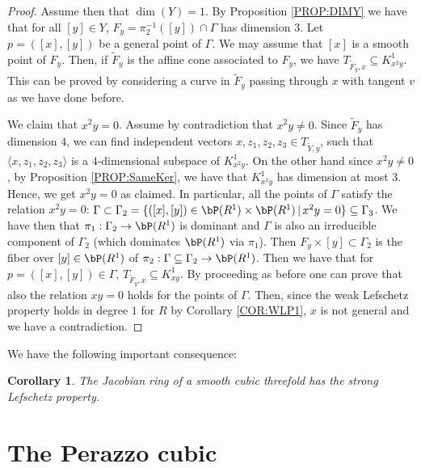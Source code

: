 \documentclass[a4paper,11pt]{amsart}
\newtheorem{corollary}[theorem]{Corollary}
\begin{document}
\begin{proof}
Assume then that $\dim(Y)=1$. By Proposition \ref{PROP:DIMY} we have that for all $[y]\in Y$, $F_y=\pi_2^{-1}([y])\cap \Gamma$ has dimension $3$. Let $p=([x],[y])$ be a general point of $\Gamma$. We may assume that $[x]$ is a smooth point of $F_y$. Then, if $\tilde{F}_y$ is the affine cone associated to $F_y$, we have $T_{\tilde{F}_y,x}\subseteq K^1_{x^2y}$. This can be proved by considering a curve in $\tilde{F}_y$ passing through $x$ with tangent $v$ as we have done before. 
\vspace{2mm}

We claim that $x^2y=0$. Assume by contradiction that $x^2y\neq 0$. Since $\tilde{F}_y$ has dimension $4$, we can find independent vectors $x,z_1,z_2,z_3 \in T_{\tilde{Y},y}$, such that $\langle x,z_1,z_2,z_3\rangle$ is a $4$-dimensional subspace of $K^1_{x^2y}$. On the other hand since $x^2y\neq 0$, by Proposition \ref{PROP:SameKer}, we have that $K^1_{x^2y}$ has dimension at most $3$. Hence, we get $x^2y=0$ as claimed. In particular, all the points of $\Gamma$ satisfy the relation $x^2y=0$: $\Gamma\subset \Gamma_2=\{([x],[y])\in \bP(R^1)\times \bP(R^1)\,|\, x^2y=0\}\subseteq \Gamma_3$. We have then that $\pi_1:\Gamma_2\to \bP(R^1)$ is dominant and $\Gamma$ is also an irreducible component of $\Gamma_2$ (which dominates $\bP(R^1)$ via $\pi_1$). Then $F_y\times [y]\subset \Gamma_2$ is the fiber over $[y]\in \bP(R^1)$ of $\pi_2:\Gamma\subseteq \Gamma_2\to \bP(R^1)$. Then we have that for $p=([x],[y])\in \Gamma$, $T_{\tilde{F}_y,x}\subseteq K^1_{xy}$. By proceeding as before one can prove that also the relation $xy=0$ holds for the points of $\Gamma$. Then, since the weak Lefschetz property holds in degree $1$ for $R$ by Corollary \ref{COR:WLP1}, $x$ is not general and we have a contradiction.
\end{proof}

We have the following important consequence:
\begin{corollary}
The Jacobian ring of a smooth cubic threefold has the strong Lefschetz property.
\end{corollary}




\section{The Perazzo cubic}
\label{SEC:5}
\end{document}
